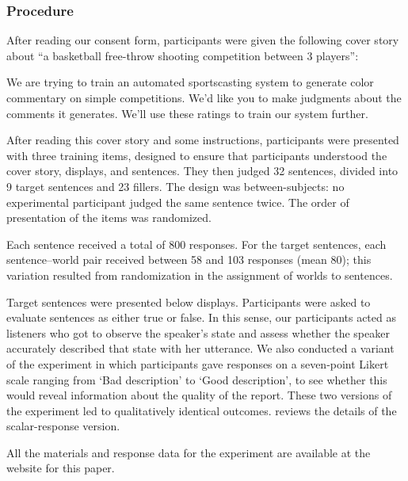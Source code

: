 \documentclass[leqno,12pt]{article}
\begin{document}
\subsubsection{Procedure} 

After reading our consent form, participants were given the following
cover story about ``a basketball free-throw shooting competition
between 3 players'':
%
\begin{examples}
\item\label{coverstory} We are trying to train an automated
  sportscasting system to generate color commentary on simple
  competitions. We'd like you to make judgments about the comments it
  generates. We'll use these ratings to train our system further.
\end{examples}

After reading this cover story and some instructions, participants
were presented with three training items, designed to ensure that
participants understood the cover story, displays, and sentences. They
then judged 32 sentences, divided into 9 target sentences and 23
fillers. The design was between-subjects: no experimental participant
judged the same sentence twice. The order of presentation of the items
was randomized.
 
Each sentence received a total of 800 responses. For the target
sentences, each sentence--world pair received between 58 and 103
responses (mean 80); this variation resulted from randomization in the
assignment of worlds to sentences.

Target sentences were presented below displays. Participants were
asked to evaluate sentences as either true or false. In this sense,
our participants acted as listeners who got to observe the speaker's
state and assess whether the speaker accurately described that state
with her utterance. We also conducted a variant of the experiment in
which participants gave responses on a seven-point Likert scale
ranging from `Bad description' to `Good description', to see whether
this would reveal information about the quality of the report. These
two versions of the experiment led to qualitatively identical
outcomes.  reviews the details of the
scalar-response version.

All the materials and response data for the experiment are available
at the website for this paper.
\end{document}
